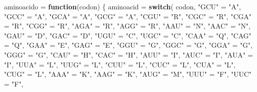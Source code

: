 \documentclass[
]{article}
\newenvironment{Shaded}{\begin{snugshade}}{\end{snugshade}}
\newcommand{\ControlFlowTok}[1]{\textcolor[rgb]{0.13,0.29,0.53}{\textbf{#1}}}
\newcommand{\NormalTok}[1]{#1}
\newcommand{\OtherTok}[1]{\textcolor[rgb]{0.56,0.35,0.01}{#1}}
\newcommand{\StringTok}[1]{\textcolor[rgb]{0.31,0.60,0.02}{#1}}
\begin{document}
\begin{Shaded}
\begin{Highlighting}[]
\NormalTok{aminoacido }\OtherTok{=} \ControlFlowTok{function}\NormalTok{(codon) \{}
\NormalTok{  aminoacid }\OtherTok{=} \ControlFlowTok{switch}\NormalTok{(}
\NormalTok{    codon, }
    \StringTok{"GCU"} \OtherTok{=} \StringTok{"A"}\NormalTok{, }\StringTok{"GCC"} \OtherTok{=} \StringTok{"A"}\NormalTok{, }\StringTok{"GCA"} \OtherTok{=} \StringTok{"A"}\NormalTok{, }\StringTok{"GCG"} \OtherTok{=} \StringTok{"A"}\NormalTok{,}
    \StringTok{"CGU"} \OtherTok{=} \StringTok{"R"}\NormalTok{, }\StringTok{"CGC"} \OtherTok{=} \StringTok{"R"}\NormalTok{, }\StringTok{"CGA"} \OtherTok{=} \StringTok{"R"}\NormalTok{, }\StringTok{"CGG"} \OtherTok{=} \StringTok{"R"}\NormalTok{,}
    \StringTok{"AGA"} \OtherTok{=} \StringTok{"R"}\NormalTok{, }\StringTok{"AGG"} \OtherTok{=} \StringTok{"R"}\NormalTok{, }\StringTok{"AAU"} \OtherTok{=} \StringTok{"N"}\NormalTok{, }\StringTok{"AAC"} \OtherTok{=} \StringTok{"N"}\NormalTok{,}
    \StringTok{"GAU"} \OtherTok{=} \StringTok{"D"}\NormalTok{, }\StringTok{"GAC"} \OtherTok{=} \StringTok{"D"}\NormalTok{, }\StringTok{"UGU"} \OtherTok{=} \StringTok{"C"}\NormalTok{, }\StringTok{"UGC"} \OtherTok{=} \StringTok{"C"}\NormalTok{,}
    \StringTok{"CAA"} \OtherTok{=} \StringTok{"Q"}\NormalTok{, }\StringTok{"CAG"} \OtherTok{=} \StringTok{"Q"}\NormalTok{, }\StringTok{"GAA"} \OtherTok{=} \StringTok{"E"}\NormalTok{, }\StringTok{"GAG"} \OtherTok{=} \StringTok{"E"}\NormalTok{,}
    \StringTok{"GGU"} \OtherTok{=} \StringTok{"G"}\NormalTok{, }\StringTok{"GGC"} \OtherTok{=} \StringTok{"G"}\NormalTok{, }\StringTok{"GGA"} \OtherTok{=} \StringTok{"G"}\NormalTok{, }\StringTok{"GGG"} \OtherTok{=} \StringTok{"G"}\NormalTok{,}
    \StringTok{"CAU"} \OtherTok{=} \StringTok{"H"}\NormalTok{, }\StringTok{"CAC"} \OtherTok{=} \StringTok{"H"}\NormalTok{, }\StringTok{"AUU"} \OtherTok{=} \StringTok{"I"}\NormalTok{, }\StringTok{"AUC"} \OtherTok{=} \StringTok{"I"}\NormalTok{,}
    \StringTok{"AUA"} \OtherTok{=} \StringTok{"I"}\NormalTok{, }\StringTok{"UUA"} \OtherTok{=} \StringTok{"L"}\NormalTok{, }\StringTok{"UUG"} \OtherTok{=} \StringTok{"L"}\NormalTok{, }\StringTok{"CUU"} \OtherTok{=} \StringTok{"L"}\NormalTok{,}
    \StringTok{"CUC"} \OtherTok{=} \StringTok{"L"}\NormalTok{, }\StringTok{"CUA"} \OtherTok{=} \StringTok{"L"}\NormalTok{, }\StringTok{"CUG"} \OtherTok{=} \StringTok{"L"}\NormalTok{, }\StringTok{"AAA"} \OtherTok{=} \StringTok{"K"}\NormalTok{,}
    \StringTok{"AAG"} \OtherTok{=} \StringTok{"K"}\NormalTok{, }\StringTok{"AUG"} \OtherTok{=} \StringTok{"M"}\NormalTok{, }\StringTok{"UUU"} \OtherTok{=} \StringTok{"F"}\NormalTok{, }\StringTok{"UUC"} \OtherTok{=} \StringTok{"F"}\NormalTok{,}

\end{Highlighting}
\end{Shaded}
\end{document}
